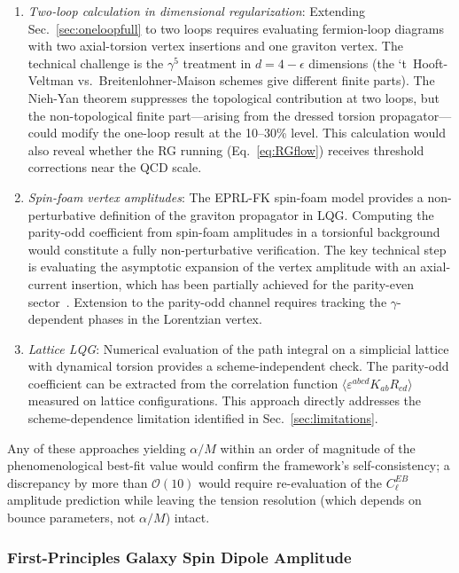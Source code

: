 \documentclass[aps,prd,twocolumn,superscriptaddress,showpacs,preprintnumbers,nofootinbib,longbibliography,floatfix]{revtex4-2}
\begin{document}
\begin{enumerate}[leftmargin=*]
\item \textit{Two-loop calculation in dimensional regularization}: Extending Sec.~\ref{sec:oneloopfull} to two loops requires evaluating fermion-loop diagrams with two axial-torsion vertex insertions and one graviton vertex. The technical challenge is the $\gamma^5$ treatment in $d=4-\epsilon$ dimensions (the `t~Hooft-Veltman vs.\ Breitenlohner-Maison schemes give different finite parts). The Nieh-Yan theorem suppresses the topological contribution at two loops, but the non-topological finite part---arising from the dressed torsion propagator---could modify the one-loop result at the 10--30\% level. This calculation would also reveal whether the RG running (Eq.~\ref{eq:RGflow}) receives threshold corrections near the QCD scale.

\item \textit{Spin-foam vertex amplitudes}: The EPRL-FK spin-foam model provides a non-perturbative definition of the graviton propagator in LQG. Computing the parity-odd coefficient from spin-foam amplitudes in a torsionful background would constitute a fully non-perturbative verification. The key technical step is evaluating the asymptotic expansion of the vertex amplitude with an axial-current insertion, which has been partially achieved for the parity-even sector~\cite{Ashtekar2011}. Extension to the parity-odd channel requires tracking the $\gamma$-dependent phases in the Lorentzian vertex.

\item \textit{Lattice LQG}: Numerical evaluation of the path integral on a simplicial lattice with dynamical torsion provides a scheme-independent check. The parity-odd coefficient can be extracted from the correlation function $\langle\varepsilon^{abcd}K_{ab}R_{cd}\rangle$ measured on lattice configurations. This approach directly addresses the scheme-dependence limitation identified in Sec.~\ref{sec:limitations}.
\end{enumerate}

Any of these approaches yielding $\alpha/M$ within an order of magnitude of the phenomenological best-fit value would confirm the framework's self-consistency; a discrepancy by more than $\mathcal{O}(10)$ would require re-evaluation of the $C_\ell^{EB}$ amplitude prediction while leaving the tension resolution (which depends on bounce parameters, not $\alpha/M$) intact.

\subsubsection{First-Principles Galaxy Spin Dipole Amplitude}
\end{document}
